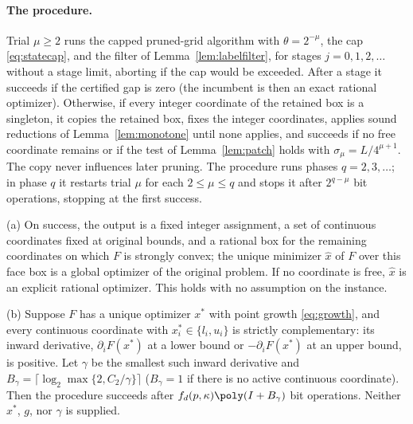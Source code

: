 \paragraph{The procedure.}
Trial $\mu\ge2$ runs the capped pruned-grid algorithm with $\theta=2^{-\mu}$,
the cap \eqref{eq:statecap}, and the filter of Lemma~\ref{lem:labelfilter},
for stages $j=0,1,2,\ldots$ without a stage limit, aborting if the cap would be
exceeded. After a stage it succeeds if the certified gap is zero (the
incumbent is then an exact rational optimizer). Otherwise, if every integer
coordinate of the retained box is a singleton, it copies the retained box,
fixes the integer coordinates, applies sound reductions of
Lemma~\ref{lem:monotone} until none applies, and succeeds if no free
coordinate remains or if the test of Lemma~\ref{lem:patch} holds with
$\sigma_\mu=L/4^{\mu+1}$. The copy never influences later pruning. The
procedure runs phases $q=2,3,\ldots$; in phase $q$ it restarts trial $\mu$ for
each $2\le\mu\le q$ and stops it after $2^{q-\mu}$ bit operations, stopping at
the first success.

\begin{theorem}\label{thm:boundary}
(a) On success, the output is a fixed integer assignment, a set of continuous
coordinates fixed at original bounds, and a rational box for the remaining
coordinates on which $F$ is strongly convex; the unique minimizer $\hat x$ of
$F$ over this face box is a global optimizer of the original problem. If no
coordinate is free, $\hat x$ is an explicit rational optimizer. This holds
with no assumption on the instance.

(b) Suppose $F$ has a unique optimizer $x^*$ with point growth
\eqref{eq:growth}, and every continuous coordinate with $x^*_i\in\{l_i,u_i\}$
is strictly complementary: its inward derivative, $\partial_iF(x^*)$ at a
lower bound or $-\partial_iF(x^*)$ at an upper bound, is positive. Let
$\gamma$ be the smallest such inward derivative and
$B_\gamma=\lceil\log_2\max\{2,C_2/\gamma\}\rceil$ ($B_\gamma=1$ if there is
no active continuous coordinate). Then the procedure succeeds after
$f_d(p,\kappa)\poly(I+B_\gamma)$ bit operations. Neither $x^*$, $g$, nor
$\gamma$ is supplied.
\end{theorem}

